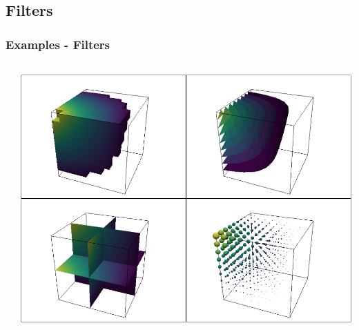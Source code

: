 \documentclass[t]{beamer}
\begin{document}
\subsection{Filters}
\begin{frame}
  \frametitle{Examples - Filters}

  \begin{center}
    \begin{columns}[T]
      \begin{column}{.5\textwidth}
        \inputminted[fontsize=\footnotesize]{python}{code/filters.py}
      \end{column}

      \begin{column}{.5\textwidth}
        \centering
        \includegraphics[width=1.0\textwidth]{figures/filters.png}
      \end{column}
    \end{columns}
  \end{center}

\end{frame}
\end{document}
